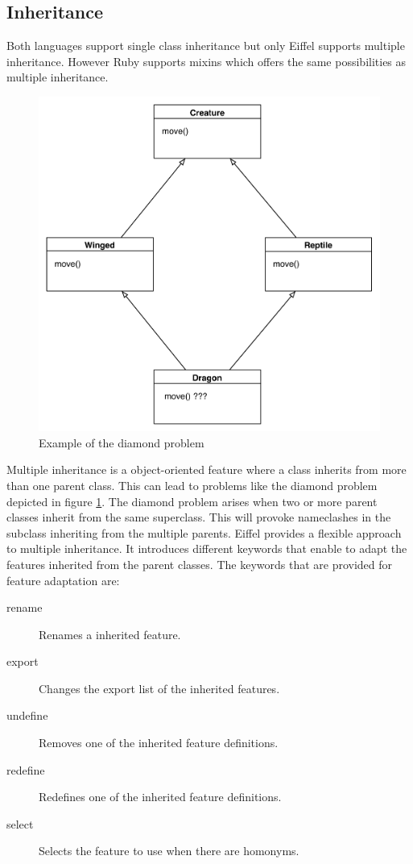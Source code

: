 \documentclass[12pt,a4paper,twocolumn]{article}
\begin{document}
\subsection{Inheritance}
Both languages support single class inheritance but only Eiffel supports multiple inheritance. However Ruby supports mixins which offers the same possibilities as multiple inheritance.
\\
% 
\begin{figure}[h!]
\centering
\includegraphics[scale=0.4]{diamond.pdf}
\caption{Example of the diamond problem}
\label{fig:diamond}
\end{figure}
Multiple inheritance is a object-oriented feature where a class inherits from more than one parent class. This can lead to problems like the diamond problem depicted in figure \ref{fig:diamond}. The diamond problem arises when two or more parent classes inherit from the same superclass. This will provoke nameclashes in the subclass inheriting from the multiple parents. Eiffel provides a flexible approach to multiple inheritance. It introduces different keywords that enable to adapt the features inherited from the parent classes. The keywords that are provided for feature adaptation are:
\begin{description}
\item[rename] Renames a inherited feature.
\item[export] Changes the export list of the inherited features.
\item[undefine] Removes one of the inherited feature definitions.
\item[redefine] Redefines one of the inherited feature definitions.
\item[select] Selects the feature to use when there are homonyms.
\end{description}
\end{document}
